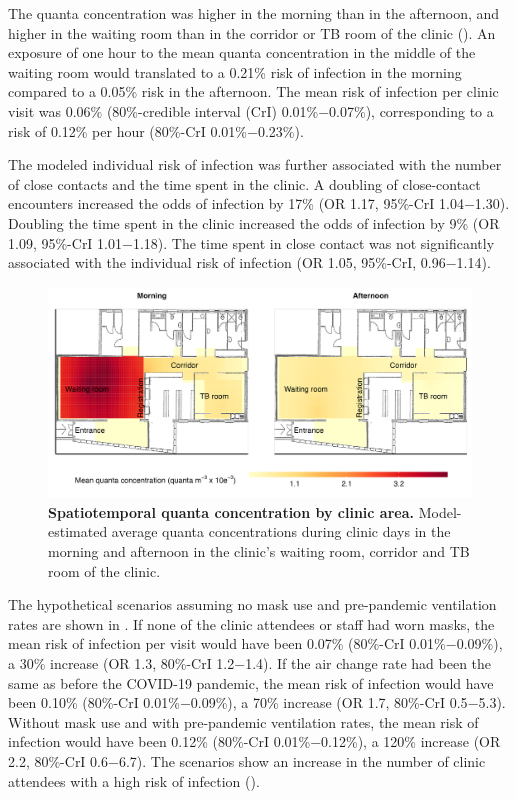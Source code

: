 \documentclass[fleqn,11pt]{wlscirep}
\begin{document}
The quanta concentration was higher in the morning than in the afternoon, and higher in the waiting room than in the corridor or TB room of the clinic (). An exposure of one hour to the mean quanta concentration in the middle of the waiting room would translated to a 0.21\% risk of infection in the morning compared to a 0.05\% risk in the afternoon. The mean risk of infection per clinic visit was 0.06\% (80\%-credible interval (CrI) 0.01\%$-$0.07\%), corresponding to a risk of 0.12\% per hour (80\%-CrI 0.01\%$-$0.23\%). 

The modeled individual risk of infection was further associated with the number of close contacts and the time spent in the clinic. A doubling of close-contact encounters increased the odds of infection by 17\% (OR 1.17, 95\%-CrI 1.04$-$1.30). Doubling the time spent in the clinic increased the odds of infection by 9\% (OR 1.09, 95\%-CrI 1.01$-$1.18). The time spent in close contact was not significantly associated with the individual risk of infection (OR 1.05, 95\%-CrI, 0.96$-$1.14). 

\begin{figure}
    \centering
    \includegraphics{results/modeling/mean-quanta-concentration.png}
    \caption{\textbf{Spatiotemporal quanta concentration by clinic area.} Model-estimated average quanta concentrations during clinic days in the morning and afternoon in the clinic's waiting room, corridor and TB room of the clinic.}
    \label{fig:main-modeling-results}
\end{figure}

The hypothetical scenarios assuming no mask use and pre-pandemic ventilation rates are shown in  . If none of the clinic attendees or staff had worn masks, the mean risk of infection per visit would have been 0.07\% (80\%-CrI 0.01\%$-$0.09\%), a 30\% increase (OR 1.3, 80\%-CrI 1.2$-$1.4). If the air change rate had been the same as before the COVID-19 pandemic, the mean risk of infection would have been 0.10\% (80\%-CrI 0.01\%$-$0.09\%), a 70\% increase (OR 1.7, 80\%-CrI 0.5$-$5.3). Without mask use and with pre-pandemic ventilation rates, the mean risk of infection would have been 0.12\% (80\%-CrI 0.01\%$-$0.12\%), a 120\% increase (OR 2.2, 80\%-CrI 0.6$-$6.7). The scenarios show an increase in the number of clinic attendees with a high risk of infection (). 
\end{document}
